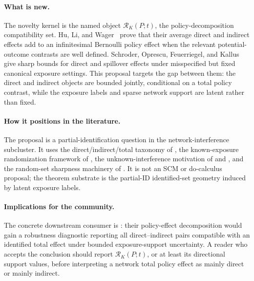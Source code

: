 \documentclass[11pt]{article}
\theoremstyle{definition}
\theoremstyle{plain}
\theoremstyle{remark}
\begin{document}
\paragraph{What is new.}
The novelty kernel is the named object
\(\mathcal R_K(P;t)\), the policy-decomposition compatibility set.  Hu, Li, and
Wager~\citep{HuLiWager2022} prove that their average direct and indirect
effects add to an infinitesimal Bernoulli policy effect when the relevant
potential-outcome contrasts are well defined.  Schroder, Oprescu, Feuerriegel,
and Kallus~\citep{SchroderOprescuFeuerriegelKallus2026} give sharp bounds for
direct and spillover effects under misspecified but fixed canonical exposure
settings.  This proposal targets the gap between them: the direct and indirect
objects are bounded jointly, conditional on a total policy contrast, while the
exposure labels and sparse network support are latent rather than fixed.

\paragraph{How it positions in the literature.}
The proposal is a partial-identification question in the network-interference
subcluster.  It uses the direct/indirect/total taxonomy of
\citet{HudgensHalloran2008}, the known-exposure randomization framework of
\citet{AronowSamii2017}, the unknown-interference motivation of
\citet{HoshinoYanagi2024} and \citet{Savje2024}, and the random-set sharpness
machinery of \citet{BeresteanuMolchanovMolinari2011}.  It is not an SCM or
do-calculus proposal; the theorem substrate is the partial-ID identified-set
geometry induced by latent exposure labels.

\paragraph{Implications for the community.}
The concrete downstream consumer is \citet{HuLiWager2022}: their policy-effect
decomposition would gain a robustness diagnostic reporting all direct--indirect
pairs compatible with an identified total effect under bounded exposure-support
uncertainty.  A reader who accepts the conclusion should report
\(\mathcal R_K(P;t)\), or at least its directional support values, before
interpreting a network total policy effect as mainly direct or mainly indirect.
\end{document}
